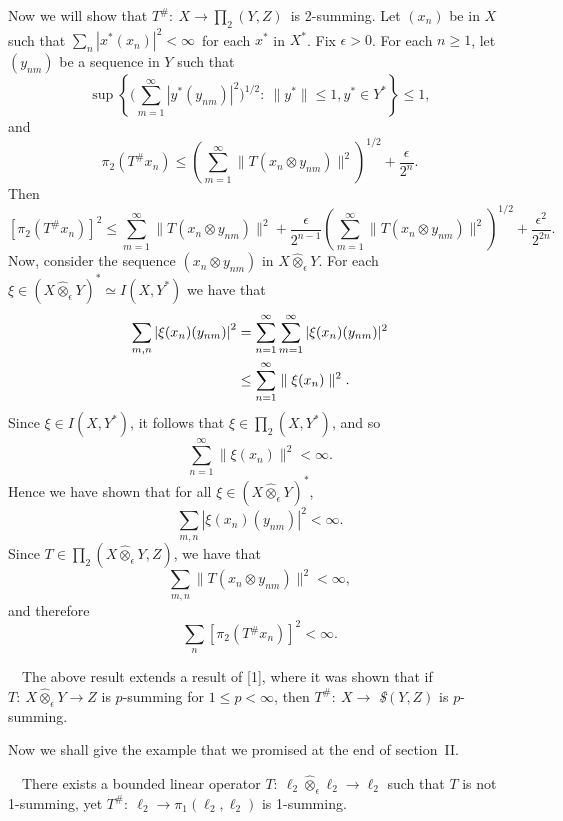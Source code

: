 Now we will show that $T^\#:\ X\longrightarrow \prod_2 (Y,Z)$\ is 
2-summing.
Let $(x_n)$ be in $X$ such that $\sum\limits_n|x^*(x_n)|^2<\infty$\ 
for
each $x^*$ in $X^*$.  Fix $\epsilon>0$.  For each $n\geq 1$, let
$(y_{nm})$ be a sequence in $Y$ such that
$$
\sup\left\{\Bigg(\sum\limits^\infty_{m=1}|y^*(y_{nm})|^2\Bigg)^{1/2}:\
\parallel y^*\parallel \leq 1, y^*\in Y^*\right\}\leq 1 ,
$$
and 
$$
\pi_2\left(T^\#x_n\right)\leq \left(\sum\limits^\infty_{m=1}\parallel
T(x_n\otimes y_{nm})\parallel^2\right)^{1/2}+\dfrac \epsilon {2^n}.
$$
Then
$$
\left[\pi_2\left(T^\#x_n\right)\right]^2\leq
\sum\limits^\infty_{m=1}\parallel T\left(x_n\otimes
y_{nm}\right)\parallel^2+\dfrac \epsilon
{2^{n-1}}\left(\sum\limits^\infty_{m=1}\parallel T\left(x_n\otimes
y_{nm}\right)\parallel^2\right)^{1/2}+\dfrac {\epsilon^2}{2^{2n}} 
.\qquad
$$
Now, consider the sequence $(x_n\otimes y_{nm})$ in $X\hat 
\otimes_\epsilon
Y$.  For each $\xi \in \left(X\hat \otimes_\epsilon Y\right)^*\simeq
I(X,Y^*)$ we have that
$$
\aligned
\sum\limits_{m,n}\left|\xi(x_n)(y_{nm})\right|^2&=\sum\limits^\infty_{n
=1}
\sum\limits^\infty_{m=1}|\xi (x_n)(y_{nm})|^2\\
&\leq \sum\limits^\infty_{n=1}\parallel \xi (x_n)\parallel ^2.
\endaligned
$$
Since $\xi \in I(X,Y^*)$, it follows that $\xi\in \prod_2(X,Y^*)$, and 
so
$$
\sum\limits^\infty_{n=1}\parallel \xi (x_n)\parallel^2<\infty.
$$
Hence we have shown that for all $\xi \in (X\hat \otimes_\epsilon 
Y)^*$,
$$
\sum\limits_{m,n} \left|\xi (x_n)(y_{nm})\right|^2<\infty.
$$
Since $T\in
\prod_2\left(X\hat \otimes_\epsilon Y, Z\right)$, we have that
$$
\sum\limits_{m,n}\parallel T(x_n\otimes y_{nm})\parallel^2<\infty,
$$
and therefore
$$
\sum\limits_n\left[\pi_2\left(T{^\#}\!\!x_n\right)\right]^2<\infty.
$$
\endproof

\ \ The above result extends a result of [1], 
where
it was shown that if
$T:\ X\hat
\otimes_\epsilon Y\longrightarrow Z$ is $p$-summing for $1\leq
p<\infty$, then $T^\#:\ X\longrightarrow$ {\it \$}$(Y,Z)$ is
$p$-summing.

\medskip

Now we shall give the example that we promised at the end of 
section~II.

\medskip

\ \ There exists a bounded linear operator 
$T:\
\ell_2\hat\otimes_\epsilon \ell_2\longrightarrow \ell_2$ such that
$T$ is not 1-summing, yet $T^\#:\ \ell_2\longrightarrow \pi_1(\ell_2,
\ell_2)$ is 1-summing.

